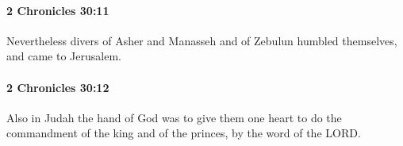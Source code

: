 		\paragraph{2 Chronicles 30:11} %
			\label{2CHRONICLES-30-11}

			Nevertheless divers of Asher and Manasseh and of Zebulun humbled themselves, and came to Jerusalem.


		\paragraph{2 Chronicles 30:12} %
			\label{2CHRONICLES-30-12}

			Also in Judah the hand of God was to give them one heart to do the commandment of the king and of the princes, by the word of the LORD.


